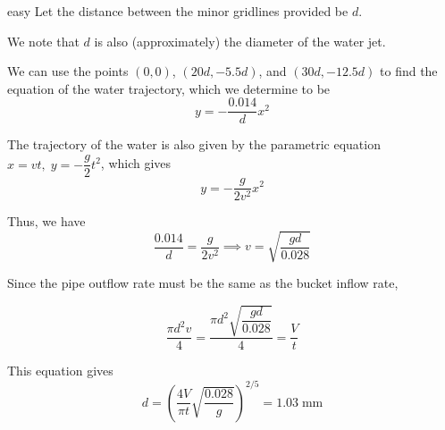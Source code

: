 \begin{solution}{easy}
Let the distance between the minor gridlines provided be $d$.\vspace{3mm}

We note that $d$ is also (approximately) the diameter of the water jet.\vspace{3mm}

We can use the points $(0,0)$, $(20d,-5.5d)$, and $(30d,-12.5d)$ to find the equation of the water trajectory, which we determine to be $$y=-\dfrac{0.014}{d}x^2$$

The trajectory of the water is also given by the parametric equation $x=vt,\;y=-\dfrac{g}{2}t^2$, which gives $$y=-\dfrac{g}{2v^2}x^2$$

Thus, we have $$\dfrac{0.014}{d}=\dfrac{g}{2v^2}\implies v=\sqrt{\dfrac{gd}{0.028}}$$

Since the pipe outflow rate must be the same as the bucket inflow rate,

$$\dfrac{\pi d^2v}{4}=\dfrac{\pi d^2\sqrt{\dfrac{gd}{0.028}}}{4}=\dfrac{V}{t}$$

This equation gives $$d=\left(\dfrac{4V}{\pi t}\sqrt{\dfrac{0.028}{g}}\right)^{2/5}=\boxed{1.03\;\text{mm}}$$
\end{solution}